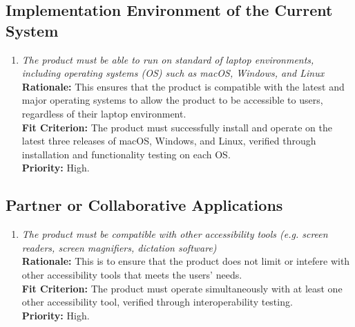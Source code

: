 \documentclass[12pt]{article}
\begin{document}
\subsection{Implementation Environment of the Current System}
\begin{enumerate}[label=MD-IE \arabic*., wide=0pt, leftmargin=*]
  \item \emph{The product must be able to run on standard of laptop
      environments, including operating systems (OS) such as
    macOS, Windows, and Linux}\\[2mm]
    {\bf Rationale:} This ensures that the product is compatible with
    the latest and major operating systems to allow the product to be
    accessible to users, regardless of their laptop environment.\\
    {\bf Fit Criterion:} The product must successfully install and
    operate on the latest three releases of macOS, Windows, and Linux,
    verified through installation and functionality testing on each OS.\\
    {\bf Priority:} High.
\end{enumerate}
\subsection{Partner or Collaborative Applications}
\begin{enumerate}[label=MD-PA \arabic*., wide=0pt, leftmargin=*]
  \item \emph{The product must be compatible with other accessibility
    tools (e.g. screen readers, screen magnifiers, dictation software)}\\[2mm]
    {\bf Rationale:} This is to ensure that the product does not
    limit or intefere with other accessibility tools that
    meets the users' needs. \\
    {\bf Fit Criterion:} The product must operate simultaneously with
    at least one other accessibility tool,
    verified through interoperability testing. \\
    {\bf Priority:} High.
\end{enumerate}
\end{document}
